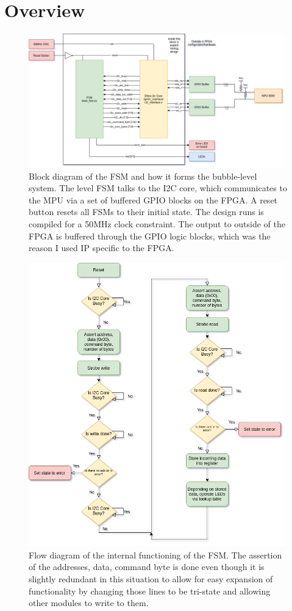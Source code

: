 \documentclass[11pt]{article}
\begin{document}
\section{Overview}
\begin{figure}[H]
    \centering
\includegraphics[width=0.99\textwidth]{fsm.png}
    \caption{Block diagram of the FSM and how it forms the bubble-level system. The level FSM talks to the I2C core, which communicates to the MPU via a set of buffered GPIO blocks on the FPGA. A reset button resets all FSMs to their initial state. The design runs is compiled for a 50MHz clock constraint. The output to outside of the FPGA is buffered through the GPIO logic blocks, which was the reason I used IP specific to the FPGA.}
\end{figure}

\begin{figure}[H]
    \centering
\includegraphics[width=0.99\textwidth]{flow.png}
    \caption{Flow diagram of the internal functioning of the FSM. The assertion of the addresses, data, command byte is done even though it is slightly redundant in this situation to allow for easy expansion of functionality by changing those lines to be tri-state and allowing other modules to write to them.}
\end{figure}
\end{document}

